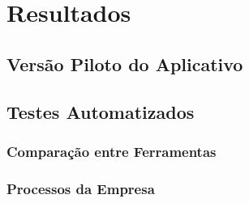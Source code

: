 \chapter{Resultados}

\section{Versão Piloto do Aplicativo}

\section{Testes Automatizados}

\subsection{Comparação entre Ferramentas}

\subsection{Processos da Empresa}